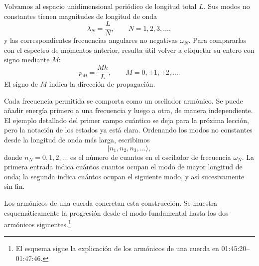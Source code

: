 Volvamos al espacio unidimensional periódico de longitud total \(L\). Sus modos no constantes tienen magnitudes de longitud de onda
\begin{equation}
\lambda_N=\frac{L}{N},
\qquad N=1,2,3,\ldots ,
\end{equation}
y las correspondientes frecuencias angulares no negativas \(\omega_N\). Para compararlas con el espectro de momentos anterior, resulta útil volver a etiquetar su entero con signo mediante \(M\):
\begin{equation}
p_M=\frac{Mh}{L},
\qquad M=0,\pm1,\pm2,\ldots .
\end{equation}
El signo de \(M\) indica la dirección de propagación.

Cada frecuencia permitida se comporta como un oscilador armónico. Se puede añadir energía primero a una frecuencia y luego a otra, de manera independiente. El ejemplo detallado del primer campo cuántico se deja para la próxima lección, pero la notación de los estados ya está clara. Ordenando los modos no constantes desde la longitud de onda más larga, escribimos
\begin{equation}
|n_1,n_2,n_3,\ldots\rangle,
\end{equation}
donde \(n_N=0,1,2,\ldots\) es el número de cuantos en el oscilador de frecuencia \(\omega_N\). La primera entrada indica cuántos cuantos ocupan el modo de mayor longitud de onda; la segunda indica cuántos ocupan el siguiente modo, y así sucesivamente sin fin.

Los armónicos de una cuerda concretan esta construcción. Se muestra esquemáticamente la progresión desde el modo fundamental hasta los dos armónicos siguientes.\footnote{El esquema sigue la explicación de los armónicos de una cuerda en 01:45:20--01:47:46.}

